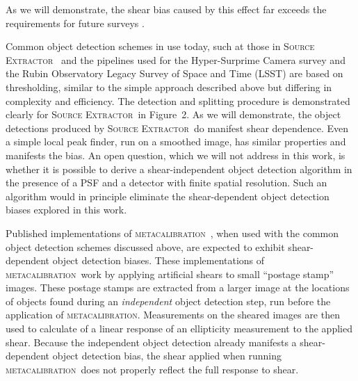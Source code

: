 \documentclass[draft, iop, twocolappendix, appendixfloats, numberedappendix, apj]{hackemulateapj}
\newcommand{\mcal}{\textsc{metacalibration}}
\newcommand{\sx}{\textsc{Source Extractor}}
\begin{document}
As we will demonstrate, the shear bias caused by this effect far exceeds the
requirements for future surveys \citep{huterer2006}.  

Common object detection schemes in use today, such at those in \sx\
\citep{Bertin96} and the pipelines used for the Hyper-Surprime Camera
survey and the Rubin Observatory Legacy Survey of Space and Time (LSST) \citep{BoschHSC2018,BoschLSST2018}
are based on thresholding, similar to the simple approach described above but
differing in complexity and efficiency.   The detection and splitting procedure
is demonstrated clearly for \sx\ in \cite{Bertin96} Figure~2.  As we will
demonstrate, the object detections produced by \sx\ do manifest shear
dependence.  Even a simple local peak finder, run on a smoothed image, has
similar properties and manifests the bias. An open question, which we will not
address in this work, is whether it is possible to derive a shear-independent
object detection algorithm in the presence of a PSF and a detector with finite
spatial resolution.  Such an algorithm would in principle eliminate the
shear-dependent object detection biases explored in this work.

Published implementations of \mcal\
\citep[e.g.,][]{HuffMcal2017,SheldonMcal2017}, when used with the common object
detection schemes discussed above, are expected to exhibit shear-dependent
object detection biases. These implementations of \mcal\ work by applying
artificial shears to small ``postage stamp'' images. These postage stamps are
extracted from a larger image at the locations of objects found during an {\em
independent} object detection step, run before the application of \mcal.
Measurements on the sheared images are then used to calculate of a linear
response of an ellipticity measurement to the applied shear. Because the
independent object detection already manifests a shear-dependent object
detection bias, the shear applied when running \mcal\ does not properly reflect
the full response to shear.

\end{document}
